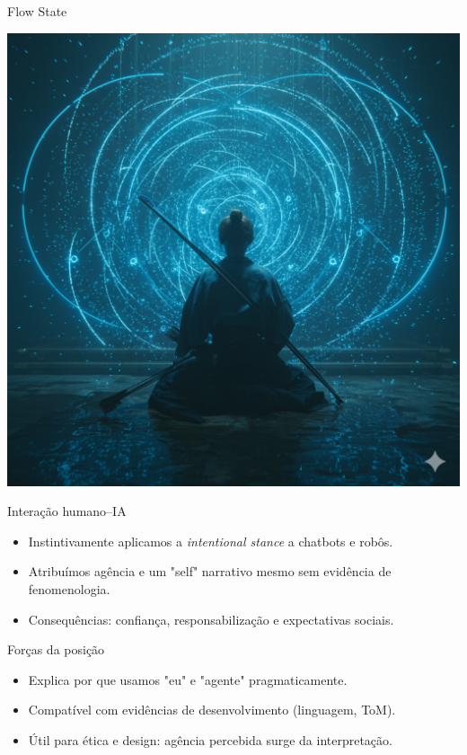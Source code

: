 \documentclass[aspectratio=169,12pt]{beamer}
\begin{document}
\begin{frame}{Flow State}
    \begin{center}
\includegraphics[scale=0.15]{mestrezen-flowstate.png}\end{center}
\end{frame} 
\begin{frame}{Interação humano–IA}
\begin{itemize}
\item Instintivamente aplicamos a \textit{intentional stance} a chatbots e robôs.
\item Atribuímos agência e um "self" narrativo mesmo sem evidência de fenomenologia.
\item Consequências: confiança, responsabilização e expectativas sociais.
\end{itemize}
\end{frame}


\begin{frame}{Forças da posição}
\begin{itemize}
\item Explica por que usamos "eu" e "agente" pragmaticamente.
\item Compatível com evidências de desenvolvimento (linguagem, ToM).
\item Útil para ética e design: agência percebida surge da interpretação.
\end{itemize}
\end{frame}
\end{document}
